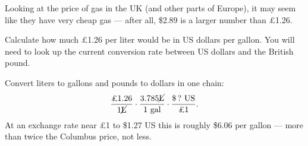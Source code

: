 \documentclass[12pt]{ximera}
\begin{document}
Looking at the price of gas in the UK (and other parts of Europe), it may seem like
they have very cheap gas --- after all, \$2.89 is a larger number than \pounds 1.26.

\begin{problem}
Calculate how much \pounds 1.26 per liter would be in US dollars per gallon. You
will need to look up the current conversion rate between US dollars and the British
pound.

\begin{freeResponse}
\end{freeResponse}

\begin{solution}
Convert liters to gallons and pounds to dollars in one chain:
\[
\frac{\text{£1.26}}{1 \cancel{\text{L}}} \cdot
\frac{3.785 \cancel{\text{L}}}{1 \text{ gal}} \cdot
\frac{\$\,?\ \text{US}}{\text{£1}}.
\]
At an exchange rate near \pounds 1 to \$1.27 US this is roughly \$6.06 per gallon
--- more than twice the Columbus price, not less.
\end{solution}
\end{problem}
\end{document}
